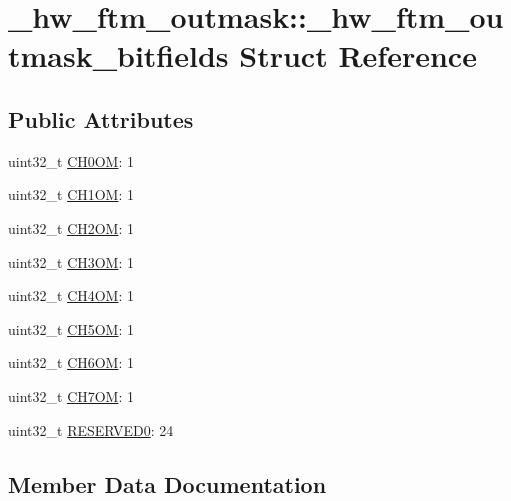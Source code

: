 \hypertarget{struct__hw__ftm__outmask_1_1__hw__ftm__outmask__bitfields}{}\section{\+\_\+hw\+\_\+ftm\+\_\+outmask\+:\+:\+\_\+hw\+\_\+ftm\+\_\+outmask\+\_\+bitfields Struct Reference}
\label{struct__hw__ftm__outmask_1_1__hw__ftm__outmask__bitfields}
\subsection*{Public Attributes}
\begin{DoxyCompactItemize}
\item 
uint32\+\_\+t \hyperlink{struct__hw__ftm__outmask_1_1__hw__ftm__outmask__bitfields_af7d7dbea29e4424f43bc7e6733f3bd67}{C\+H0\+OM}\+: 1
\item 
uint32\+\_\+t \hyperlink{struct__hw__ftm__outmask_1_1__hw__ftm__outmask__bitfields_ab286ef9925694024b25c9486d4e09662}{C\+H1\+OM}\+: 1
\item 
uint32\+\_\+t \hyperlink{struct__hw__ftm__outmask_1_1__hw__ftm__outmask__bitfields_a980c280365ba13b058354ac4d9b38cfb}{C\+H2\+OM}\+: 1
\item 
uint32\+\_\+t \hyperlink{struct__hw__ftm__outmask_1_1__hw__ftm__outmask__bitfields_a23441d5a91650b65a8a6aca1fef41138}{C\+H3\+OM}\+: 1
\item 
uint32\+\_\+t \hyperlink{struct__hw__ftm__outmask_1_1__hw__ftm__outmask__bitfields_a90675040f6a6c063ee47d52bf5506307}{C\+H4\+OM}\+: 1
\item 
uint32\+\_\+t \hyperlink{struct__hw__ftm__outmask_1_1__hw__ftm__outmask__bitfields_a6add1d88a8077c45d800f59e5dff20d0}{C\+H5\+OM}\+: 1
\item 
uint32\+\_\+t \hyperlink{struct__hw__ftm__outmask_1_1__hw__ftm__outmask__bitfields_a948594a699a50d533d19d157afd4f1a1}{C\+H6\+OM}\+: 1
\item 
uint32\+\_\+t \hyperlink{struct__hw__ftm__outmask_1_1__hw__ftm__outmask__bitfields_accb7fef71e86c401304c16e0aacdfe04}{C\+H7\+OM}\+: 1
\item 
uint32\+\_\+t \hyperlink{struct__hw__ftm__outmask_1_1__hw__ftm__outmask__bitfields_a931f5a85430a151b264e10fa558caa79}{R\+E\+S\+E\+R\+V\+E\+D0}\+: 24
\end{DoxyCompactItemize}


\subsection{Member Data Documentation}
